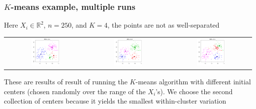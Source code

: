 \documentclass[mathserif]{beamer}
\def\R{\mathds{R}}
\def\red{\color[rgb]{0.8,0,0}}
\def\blue{\color[rgb]{0,0,0.8}}
\begin{document}
\begin{frame}
\frametitle{$K$-means example, multiple runs}
Here $X_i \in \R^2$, $n=250$, and $K=4$,
the points are not as well-separated

\bigskip
\begin{tabular}{ccc}
\hspace{-26pt} 
\includegraphics[width=0.36\textwidth]{figures/kmm1.pdf} &
\hspace{-17pt}
\includegraphics[width=0.36\textwidth]{figures/kmm2.pdf} &
\hspace{-17pt}
\includegraphics[width=0.36\textwidth]{figures/kmm3.pdf}
\end{tabular}

\smallskip
These are results of result of running the $K$-means
algorithm with different initial centers (chosen randomly
over the range of the $X_i$'s). We choose the second
collection of centers because it yields the 
{\blue smallest within-cluster variation}
\end{frame}

%
%
%
\end{document}
